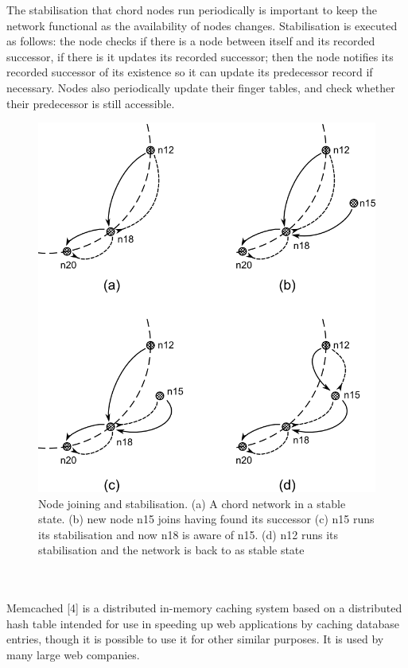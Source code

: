 \documentclass{article}
\begin{document}
The stabilisation that chord nodes run periodically is important to keep the network functional as the availability of nodes changes. Stabilisation is executed as follows: the node checks if there is a node between itself and its recorded successor, if there is it updates its recorded successor; then the node notifies its recorded successor of its existence so it can update its predecessor record if necessary. Nodes also periodically update their finger tables, and check whether their predecessor is still accessible.
\begin{figure}
\centering
\includegraphics{chord_joining.png}
\caption{Node joining and stabilisation. (a) A chord network in a stable state. (b) new node n15 joins having found its successor (c) n15 runs its stabilisation and now n18 is aware of n15. (d) n12 runs its stabilisation and the network is back to as stable state}
\end{figure}
\\
\\
Memcached [4] is a distributed in-memory caching system based on a distributed hash table intended for use in speeding up web applications by caching database entries, though it is possible to use it for other similar purposes. It is used by many large web companies.
\end{document}
